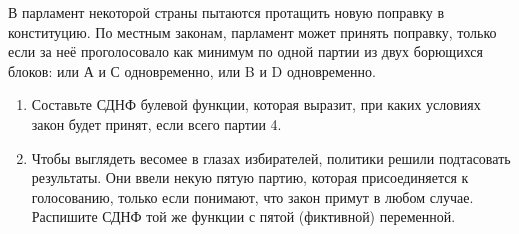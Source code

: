 \question
В парламент некоторой страны пытаются протащить новую поправку в конституцию. По местным законам, парламент может принять поправку, только если за неё проголосовало как минимум по одной партии из двух борющихся блоков: или А и С одновременно, или B и D одновременно.

\begin{enumerate}
    \item Составьте СДНФ булевой функции, которая выразит, при каких условиях закон будет принят, если всего партии 4.
    \item Чтобы выглядеть весомее в глазах избирателей, политики решили подтасовать результаты.  Они ввели некую пятую партию, которая присоединяется к голосованию, только если понимают, что закон примут в любом случае. Распишите СДНФ той же функции с пятой (фиктивной) переменной.
\end{enumerate}